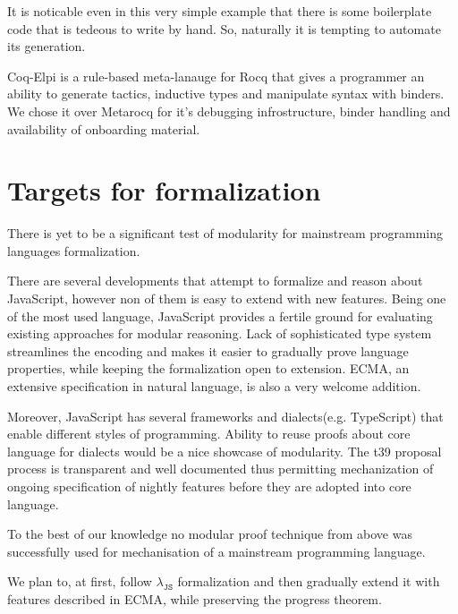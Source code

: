 \documentclass[sigplan,nonacm]{acmart}
\begin{document}
It is noticable even in this very simple example that there is some boilerplate code that is tedeous to write by hand. 
So, naturally it is tempting to automate its generation. 

Coq-Elpi\cite{tassi2025elpi} is a rule-based meta-lanauge for Rocq\cite{the_coq_development_team_2024_14542673} that gives a programmer an ability to generate tactics, inductive types and manipulate syntax with binders. 
We chose it over Metarocq for it's debugging infrostructure, binder handling and availability of onboarding material.

\section{Targets for formalization}



There is yet to be a significant test of modularity for mainstream programming languages formalization.

There are several\cite{guha2010essence}\cite{bodin2014trusted} developments that attempt to formalize and reason about JavaScript, however non of them is easy to extend with new features.
Being one of the most used language, JavaScript provides a fertile ground for evaluating existing approaches for modular reasoning. 
Lack of sophisticated type system streamlines the encoding and makes it easier to gradually prove language properties, while keeping the formalization open to extension.
ECMA\cite{ECMA}, an extensive specification in natural language, is also a very welcome addition.

Moreover, JavaScript has several frameworks\cite{React} and dialects(e.g. TypeScript) that enable different styles of programming. 
Ability to reuse proofs about core language for dialects would be a nice showcase of modularity. 
The t39 proposal process\cite{t39} is transparent and well documented thus permitting mechanization of ongoing specification of nightly features before they are adopted into core language.


To the best of our knowledge no modular proof technique from above was successfully used for mechanisation of a mainstream programming language.

We plan to, at first, follow $\lambda_{\texttt{JS}}$\cite{guha2010essence} formalization and then gradually extend it with features described in ECMA, while preserving the progress theorem.
\end{document}
